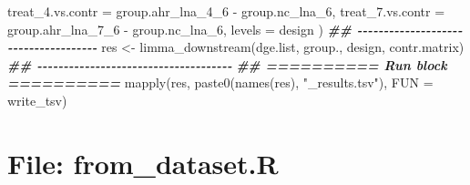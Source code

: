 \documentclass[
]{article}
\newenvironment{Shaded}{\begin{snugshade}}{\end{snugshade}}
\newcommand{\AttributeTok}[1]{\textcolor[rgb]{0.77,0.63,0.00}{#1}}
\newcommand{\DocumentationTok}[1]{\textcolor[rgb]{0.56,0.35,0.01}{\textbf{\textit{#1}}}}
\newcommand{\FunctionTok}[1]{\textcolor[rgb]{0.00,0.00,0.00}{#1}}
\newcommand{\NormalTok}[1]{#1}
\newcommand{\OtherTok}[1]{\textcolor[rgb]{0.56,0.35,0.01}{#1}}
\newcommand{\SpecialCharTok}[1]{\textcolor[rgb]{0.00,0.00,0.00}{#1}}
\newcommand{\StringTok}[1]{\textcolor[rgb]{0.31,0.60,0.02}{#1}}
\begin{document}
\begin{Shaded}
\begin{Highlighting}[]
  \AttributeTok{treat\_4.vs.contr =}\NormalTok{ group.ahr\_lna\_4\_6 }\SpecialCharTok{{-}}\NormalTok{ group.nc\_lna\_6,}
  \AttributeTok{treat\_7.vs.contr =}\NormalTok{ group.ahr\_lna\_7\_6 }\SpecialCharTok{{-}}\NormalTok{ group.nc\_lna\_6,}
  \AttributeTok{levels =}\NormalTok{ design}
\NormalTok{)}
\DocumentationTok{\#\# {-}{-}{-}{-}{-}{-}{-}{-}{-}{-}{-}{-}{-}{-}{-}{-}{-}{-}{-}{-}{-}{-}{-}{-}{-}{-}{-}{-}{-}{-}{-}{-}{-}{-}{-}{-}{-} }
\NormalTok{res }\OtherTok{\textless{}{-}} \FunctionTok{limma\_downstream}\NormalTok{(dge.list, group., design, contr.matrix)}
\DocumentationTok{\#\# {-}{-}{-}{-}{-}{-}{-}{-}{-}{-}{-}{-}{-}{-}{-}{-}{-}{-}{-}{-}{-}{-}{-}{-}{-}{-}{-}{-}{-}{-}{-}{-}{-}{-}{-}{-}{-} }
\DocumentationTok{\#\# ========== Run block ========== }
\FunctionTok{mapply}\NormalTok{(res, }\FunctionTok{paste0}\NormalTok{(}\FunctionTok{names}\NormalTok{(res), }\StringTok{"\_results.tsv"}\NormalTok{), }\AttributeTok{FUN =}\NormalTok{ write\_tsv)}
\end{Highlighting}
\end{Shaded}

\hypertarget{file-from_dataset.r}{%
\section{File: from\_dataset.R}\label{file-from_dataset.r}}
\end{document}
